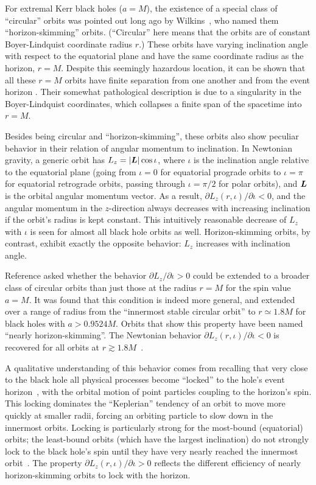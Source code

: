 \documentclass[aps,prd,twocolumn,showpacs,groupedaddress,nofootinbib]{revtex4}
\begin{document}
For extremal Kerr black holes ($a = M$), the existence of a special
class of ``circular'' orbits was pointed out long ago by
Wilkins~\cite{wilkins}, who named them ``horizon-skimming'' orbits.
(``Circular'' here means that the orbits are of constant
Boyer-Lindquist coordinate radius $r$.)  These orbits have varying
inclination angle with respect to the equatorial plane and have the
same coordinate radius as the horizon, $r = M$.  Despite this
seemingly hazardous location, it can be shown that all these $r = M$
orbits have finite separation from one another and from the event
horizon {\cite{bpt}}.  Their somewhat pathological description is due
to a singularity in the Boyer-Lindquist coordinates, which collapses a
finite span of the spacetime into $r = M$.

Besides being circular and ``horizon-skimming'', these orbits also
show peculiar behavior in their relation of angular momentum to
inclination.  In Newtonian gravity, a generic orbit has
$L_z=|\mbox{\boldmath$L$}|\cos\iota$, where $\iota$ is the inclination
angle relative to the equatorial plane (going from $\iota = 0$ for
equatorial prograde orbits to $\iota = \pi$ for equatorial retrograde
orbits, passing through $\iota = \pi/2$ for polar orbits), and
$\mbox{\boldmath$L$}$ is the orbital angular momentum vector.  As a
result, $\partial L_z(r, \iota)/\partial\iota < 0$, and the angular
momentum in the $z$-direction always decreases with increasing
inclination if the orbit's radius is kept constant.  This intuitively
reasonable decrease of $L_z$ with $\iota$ is seen for almost all black
hole orbits as well.  Horizon-skimming orbits, by contrast, exhibit
exactly the opposite behavior: $L_z$ increases with inclination angle.

Reference \cite{skimming} asked whether the behavior $\partial
L_z/\partial\iota > 0$ could be extended to a broader class of
circular orbits than just those at the radius $r = M$ for the spin
value $a = M$.  It was found that this condition is indeed more
general, and extended over a range of radius from the ``innermost
stable circular orbit'' to $r \simeq 1.8M$ for black holes with $a >
0.9524M$.  Orbits that show this property have been named ``nearly
horizon-skimming''.  The Newtonian behavior $\partial L_z(r,
\iota)/\partial \iota < 0$ is recovered for all orbits at $r\gtrsim
1.8M$~\cite{skimming}.

A qualitative understanding of this behavior comes from recalling that
very close to the black hole all physical processes become ``locked''
to the hole's event horizon~\cite{membrane}, with the orbital motion
of point particles coupling to the horizon's spin. This locking
dominates the ``Keplerian'' tendency of an orbit to move more quickly
at smaller radii, forcing an orbiting particle to slow down in the
innermost orbits.  Locking is particularly strong for the most-bound
(equatorial) orbits; the least-bound orbits (which have the largest
inclination) do not strongly lock to the black hole's spin until they
have very nearly reached the innermost orbit~\cite{skimming}.  The
property $\partial L_z(r, \iota)/\partial\iota > 0$ reflects the
different efficiency of nearly horizon-skimming orbits to lock with
the horizon.
\end{document}
